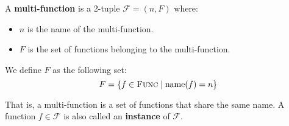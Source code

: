 \noindent A \textbf{multi-function} is a 2-tuple $\mathcal{F} = (n, F)$ where:
\begin{itemize}
	\item $n$ is the name of the multi-function.
	\item $F$ is the set of functions belonging to the multi-function.
\end{itemize}

\noindent We define $F$ as the following set:
\begin{equation*}
	F = \{ f \in \textsc{Func} \mid \operatorname{name}(f) = n \}
\end{equation*}

\noindent That is, a multi-function is a set of functions that share the same name. A function $f \in \mathcal{F}$ is also called an \textbf{instance} of $\mathcal{F}$.








